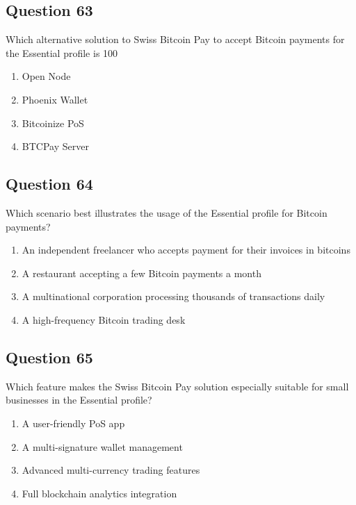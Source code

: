 \documentclass[12pt,a4paper]{article}
\begin{document}
\bigskip


\subsection*{Question 63}
Which alternative solution to Swiss Bitcoin Pay to accept Bitcoin payments for the Essential profile is 100%

\begin{enumerate}[label=\Alph*., leftmargin=*]
\item Open Node
\item Phoenix Wallet
\item Bitcoinize PoS
\item BTCPay Server
\end{enumerate}

\bigskip


\subsection*{Question 64}
Which scenario best illustrates the usage of the Essential profile for Bitcoin payments?

\begin{enumerate}[label=\Alph*., leftmargin=*]
\item An independent freelancer who accepts payment for their invoices in bitcoins
\item A restaurant accepting a few Bitcoin payments a month
\item A multinational corporation processing thousands of transactions daily
\item A high-frequency Bitcoin trading desk
\end{enumerate}

\bigskip


\subsection*{Question 65}
Which feature makes the Swiss Bitcoin Pay solution especially suitable for small businesses in the Essential profile?

\begin{enumerate}[label=\Alph*., leftmargin=*]
\item A user-friendly PoS app
\item A multi-signature wallet management
\item Advanced multi-currency trading features
\item Full blockchain analytics integration
\end{enumerate}
\end{document}
